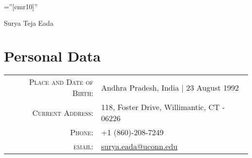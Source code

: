\documentclass[a4paper,10pt]{article}
\begin{document}

\pagestyle{empty} %

\font\fb=''[cmr10]'' %

\par{\centering
		{\Huge Surya Teja Eada 
	}\bigskip\par}

\section{Personal Data}

\begin{tabular}{rl}
    \textsc{Place and Date of Birth:} & Andhra Pradesh, India  | 23 August 1992 \\
    \textsc{Current Address:}   & 118, Foster Drive, Willimantic, CT - 06226 \\
    \textsc{Phone:}     & +1 (860)-208-7249\\
    \textsc{email:}     & \href{mailto:surya.eada@uconn.edu}{surya.eada@uconn.edu}
\end{tabular}

\end{document}
